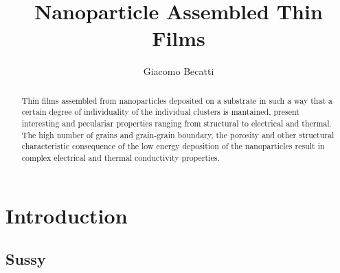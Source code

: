 \documentclass[11pt,a4paper]{article}
\author{Giacomo Becatti}
\title{Nanoparticle Assembled Thin Films}
\begin{document}
\maketitle
\begin{abstract}
Thin films assembled from nanoparticles deposited on a substrate in such a way that a certain degree of individuality of the individual clusters is mantained, present interesting and peculariar properties ranging from structural to electrical and thermal. The high number of grains and grain-grain boundary, the porosity and other structural characteristic consequence of the low energy deposition of the nanoparticles result in complex electrical and thermal conductivity properties.
\end{abstract}
\section{Introduction}
\subsection{Sussy}
\end{document}
